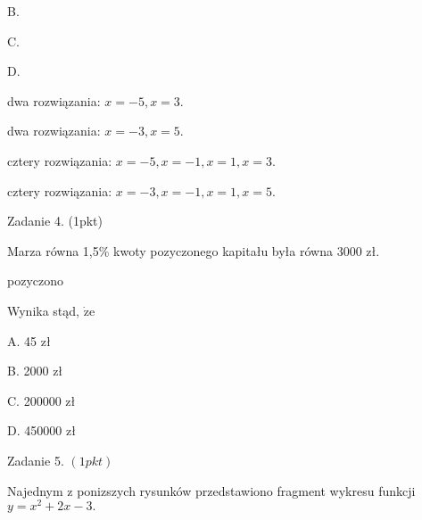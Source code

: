 \documentclass[a4paper,12pt]{article}
\begin{document}
B.

C.

D.

dwa rozwiązania: $x=-5, x=3.$

dwa rozwiązania: $x=-3, x=5.$

cztery rozwiązania: $x=-5, x=-1, x=1, x=3.$

cztery rozwiązania: $x=-3, x=-1, x=1, x=5.$

Zadanie 4. (1pkt)

Marza równa 1,5\% kwoty pozyczonego kapitału była równa 3000 zł.

pozyczono

Wynika stąd, $\dot{\mathrm{z}}\mathrm{e}$

A. 45 zł

B. 2000 zł

C. 200000 zł

D. 450000 zł

Zadanie 5. $(1pkt)$

Najednym z ponizszych rysunków przedstawiono fragment wykresu funkcji $y=x^{2}+2x-3.$
\end{document}
